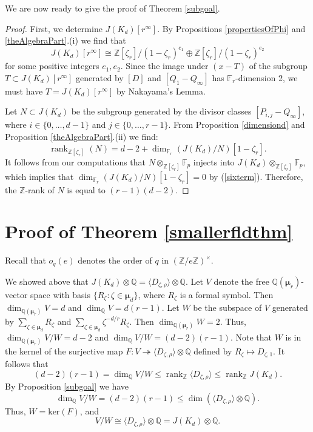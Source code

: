 \documentclass[reqno]{amsart}
\theoremstyle{definition}
\theoremstyle{remark}
\newcommand{\XminusT}{(x-T)}
\newcommand{\rk}{\operatorname{rank}}
\def\bmu{{\boldsymbol\mu}}
\def\Gal{\textrm{\upshape Gal}}
\def\Q{\mathbb{Q}}
\def\Z{\mathbb{Z}}
\def\F{\mathbb{F}}
\def\onto{\twoheadrightarrow}
\def\ker{\text{ker}}
\begin{document}
We are now ready to give the proof of Theorem \ref{subgoal}. 

\begin{proof}
First, we determine $J(K_d)[r^\infty]$. By Propositions \ref{propertiesOfPhi} and \ref{theAlgebraPart}.(i) we find that
$$
J(K_d)[r^\infty] \cong \Z[\zeta_r]/(1-\zeta_r)^{e_1} \oplus \Z[\zeta_r]/(1-\zeta_r)^{e_2}
$$
for some positive integers $e_1,e_2$. Since the image under $\XminusT$ of the subgroup $T \subset J(K_d)[r^\infty]$ generated by $[D]$ and $[Q_1 - Q_\infty]$ has $\F_r$-dimension 2, we must have $T = J(K_d)[r^\infty]$ by Nakayama's Lemma.

Let $N \subset J(K_d)$ be the subgroup generated by the divisor classes $[P_{i,j} - Q_\infty]$, where $i \in \{0,\ldots,d-1\}$ and $j \in \{0,\ldots,r-1\}$. From Proposition \ref{dimensiond} and Proposition \ref{theAlgebraPart}.(ii) we find:
$$
\rk_{\Z[\zeta_r]}(N) = d-2+\dim_{\F_r} (J(K_d)/N)[1-\zeta_r].
$$
It follows from our computations that $N \otimes_{\Z[\zeta_r]} \F_p$ injects into $J(K_d) \otimes_{\Z[\zeta_r]} \F_p$, which implies that $\dim_{\F_r} (J(K_d)/N)[1-\zeta_r]=0$ by (\ref{sixterm}). Therefore, the $\Z$-rank of $N$ is equal to $(r-1)(d-2)$.
\end{proof}



\section{Proof of Theorem \ref{smallerfldthm}}
Recall that $o_q(e)$ denotes the order of $q$ in $(\Z/e\Z)^\times$.


We showed above that $J(K_d) \otimes \Q = \langle D_{\zeta,\rho} \rangle \otimes \Q$.
Let
$V$ denote the free $\Q(\bmu_r)$-vector space with basis
$\{ R_\zeta : \zeta \in \bmu_d \}$, where $R_\zeta$ is a formal symbol.
Then $\dim_{\Q(\bmu_r)} V = d$ and $\dim_{\Q} V = d(r-1)$.
Let $W$ be the subspace of $V$ generated by 
$\sum_{\zeta \in \bmu_d}R_\zeta$ and 
$\sum_{\zeta \in \bmu_d}\zeta^{-d/r}R_\zeta$.
Then $\dim_{\Q(\bmu_r)} W = 2$.
Thus, $\dim_{\Q(\bmu_r)} V/W = d-2$ and $\dim_{\Q} V/W = (d-2)(r-1)$.
Note that $W$ is in the kernel of 
the surjective map $F : V \onto \langle D_{\zeta,\rho} \rangle \otimes \Q$
defined by $R_\zeta \mapsto D_{\zeta,1}$.
It follows that
$$
(d-2)(r-1) = \dim_{\Q} V/W  \le \rk_\Z \langle D_{\zeta,\rho} \rangle \le \rk_\Z J(K_d).
$$
By Proposition \ref{subgoal} we have 
$$
\dim_{\Q} V/W = (d-2)(r-1) \le \dim(\langle D_{\zeta,\rho} \rangle \otimes \Q).
$$
Thus, $W=\ker(F)$, and
$$
V/W \cong \langle D_{\zeta,\rho} \rangle \otimes \Q = J(K_d) \otimes \Q.
$$
\end{document}

